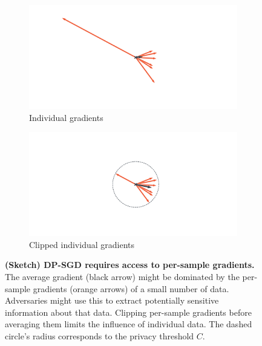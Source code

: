 \begin{figure}[!t]
  \centering
  \begin{subfigure}{0.495\linewidth}
    \includegraphics[width=\linewidth, trim={4.8cm 3.8cm 11.3cm 1.9cm}, clip]{../repos/backpack-paper/code/animations/differential-privacy/dp_frame_0}
    \caption{Individual gradients}\label{subfig:background::DifferentialPrivacy1}
  \end{subfigure}
  \begin{subfigure}{0.495\linewidth}
    \includegraphics[width=\linewidth, trim={4.8cm 3.8cm 11.3cm 1.9cm}, clip]{../repos/backpack-paper/code/animations/differential-privacy/dp_frame_4}
    \caption{Clipped individual
      gradients}\label{subfig:background::DifferentialPrivacy2}
  \end{subfigure}
  \caption{\textbf{(Sketch) DP-SGD requires access to per-sample gradients.}
     The average gradient
    (black arrow) might be dominated by the per-sample gradients (orange arrows)
    of a small number of data. Adversaries might use this to extract potentially
    sensitive information about that data.
     Clipping per-sample
    gradients before averaging them limits the influence of individual data. The
    dashed circle's radius corresponds to the privacy threshold $C$.
  }\label{fig:background::DifferentialPrivacy}
\end{figure}

